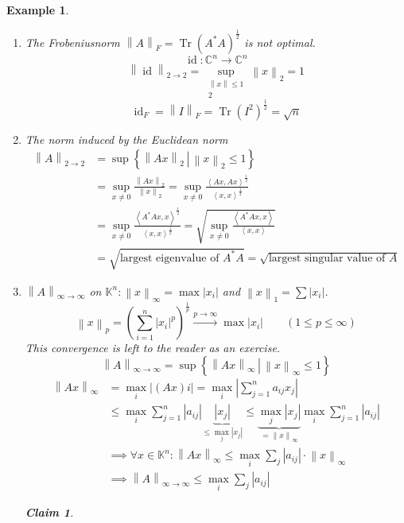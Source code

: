 \documentclass{article}
\newcounter{lecref}[section]
\numberwithin{lecref}{section}
\newtheorem{example}[lecref]{Example}
\newtheorem*{claim}{Claim}
\newcommand{\setdef}[2]{\left\{\left.#1\,\right|\,#2\right\}}
\newcommand{\angel}[1]{\left\langle#1\right\rangle}
\newcommand{\norm}[1]{\left\|#1\right\|}
\newcommand{\card}[1]{\left|#1\right|}
\begin{document}
\begin{example} %
  \begin{enumerate}
    \item The Frobeniusnorm $\norm{A}_F = \operatorname{Tr}(A^* A)^{\frac12}$ is not optimal.
      \[ \operatorname{id}: \mathbb C^n \to \mathbb C^n \]
      \[ \norm{\operatorname{id}}_{2 \to 2} = \sup_{\substack{\norm{x} \leq 1 \\ 2}} \norm{x}_2 = 1 \]
      \[ \operatorname{id}_F = \norm{I}_F = \operatorname{Tr}(I^2)^{\frac12} = \sqrt n \]
    \item The norm induced by the Euclidean norm
      \begin{align*}
        \norm{A}_{2 \to 2} &= \sup\setdef{\norm{Ax}_2}{\norm{x}_2 \leq 1} \\
          &= \sup_{x \neq 0} \frac{\norm{Ax}_2}{\norm{x}_2} = \sup_{x \neq 0} \frac{\angel{Ax, Ax}^{\frac12}}{\angel{x,x}^{\frac12}} \\
          &= \sup_{x \neq 0} \frac{\angel{A^* Ax, x}^{\frac12}}{\angel{x,x}^{\frac12}} = \sqrt{\sup_{x \neq 0} \frac{\angel{A^* Ax, x}}{\angel{x,x}}} \\
          &= \sqrt{\text{largest eigenvalue of } A^* A} = \sqrt{\text{largest singular value of } A}
      \end{align*}
    \item
      $\norm{A}_{\infty\to\infty}$ on $\mathbb K^n: \norm{x}_{\infty} = \max \card{x_i}$ and $\norm{x}_1 = \sum \card{x_i}$.
      \[ \norm{x}_p = \left(\sum_{i=1}^n \card{x_i}^p\right)^{\frac1p} \xrightarrow{p \to \infty} \max \card{x_i} \qquad (1 \leq p \leq \infty) \]
      This convergence is left to the reader as an exercise.
      \[ \norm{A}_{\infty\to\infty} = \sup\setdef{\norm{Ax}_{\infty}}{\norm{x}_\infty \leq 1} \]
      \begin{align*}
        \norm{Ax}_{\infty} &= \max_i \card{(Ax) i} = \max_i \card{\sum_{j=1}^n a_{ij} x_j} \\
          &\leq \max_i \sum_{j=1}^n \card{a_{ij}} \underbrace{\card{x_j}}_{\leq \max_j \card{x_j}}
           \leq \underbrace{\max_j \card{x_j}}_{= \norm{x}_{\infty}} \max_i \sum_{j=1}^n \card{a_{ij}} \\
          &\implies \forall x \in \mathbb K^n: \norm{Ax}_{\infty} \leq \max_i \sum_j \card{a_{ij}} \cdot \norm{x}_{\infty} \\
          &\implies \norm{A}_{\infty\to\infty} \leq \max_i \sum_j \card{a_{ij}}
      \end{align*}
      \begin{claim}

\end{claim}
\end{enumerate}
\end{example}
\end{document}
